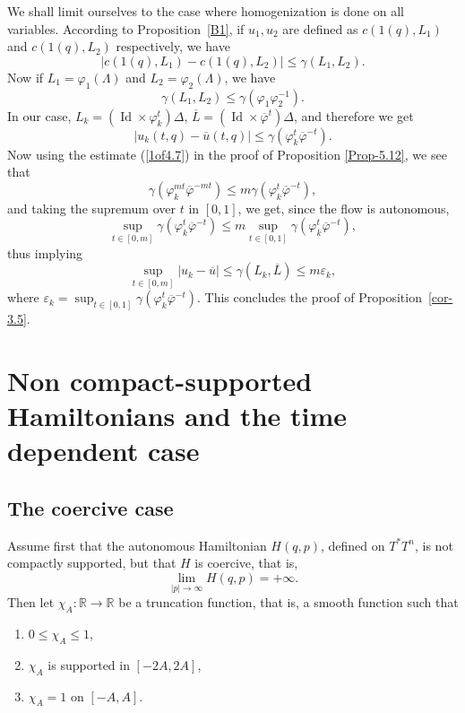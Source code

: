 \documentclass[JEP,XML,SOM,NoFloatCountersInSection,Unicode,published]{cedram}
\numberwithin{equation}{section}
\DeclareMathOperator{\Id}{Id}
\let \phi \varphi
\theoremstyle{plain}
\theoremstyle{definition}
\theoremstyle{remark}
\begin{document}
We shall limit ourselves to the case where homogenization is done on all variables.
According to Proposition~\ref{B1}, if $u_{1},u_{2}$ are defined as $c(1(q), L_{1})$ and $c(1(q),L_{2})$ respec\-tively, we have
\[
\vert c(1(q), L_{1})-c(1(q),L_{2}) \vert \leq \gamma (L_{1},L_{2}).
\]
Now if $L_{1}=\phi_{1}(\Lambda)$ and $L_{2}=\phi_{2}(\Lambda)$, we have
\[
\gamma (L_{1},L_{2})\leq \gamma (\varphi_{1}\varphi_{2}^{-1}).
\]
In our case, $L_k=(\Id\times \phi_{k}^{t})\Delta$, ${\overline L}=(\Id \times \overline{\phi}^t) \Delta $, and therefore we get
\[
\vert u_{k}(t,q)-{\overline u}(t,q) \vert \leq \gamma (\phi_{k}^{t}{\overline \phi}^{-t}).
\]
Now using the estimate (\ref{1of4.7}) in the proof of Proposition \ref{Prop-5.12}, we see that
\[
\gamma (\phi_{k}^{mt}{\overline \phi}^{-mt}) \leq m \gamma (\phi_{k}^{t}{\overline \phi}^{-t}),
\]
and taking the supremum over $t$ in $[0,1]$, we get, since the flow is autonomous,
\[
\sup_{t\in [0,m]} \gamma(\phi_{k}^{t}{\overline \phi}^{-t}) \leq m \sup_{t\in [0,1]}\gamma(\phi_{k}^{t}{\overline \phi}^{-t}),
\]
thus implying
\[
\sup_{t\in [0,m]} \vert u_{k}-\overline u \vert \leq \gamma (L_{k},\overline L)\leq m \varepsilon_{k},
\]
where $ \varepsilon_{k}= \sup_{t\in [0,1]}\gamma (\varphi_{k}^{t}{\overline\varphi}^{-t})$. This concludes the proof of Proposition~\ref{cor-3.5}.

\section{Non compact-supported Hamiltonians and the time dependent case}\label {ncs}

\subsection{The coercive case}\label{coercive-case}
Assume first that the autonomous Hamiltonian $H(q,p)$, defined on $T^*T^n$, is not compactly supported, but that $H$ is coercive, that is,
\[
\lim_{ \vert p \vert \to \infty} H(q,p)= +\infty.
\]
Then let $\chi_{A}: {\mathbb R} \to {\mathbb R} $ be a truncation function, that is, a smooth function such that

\begin{enumerate}
\item $0\leq \chi_{A}\leq 1$,
\item $\chi_{A}$ is supported in $[-2A,2A]$,
\item $\chi_{A}=1$ on $[-A,A]$.
\end{enumerate}
\end{document}
